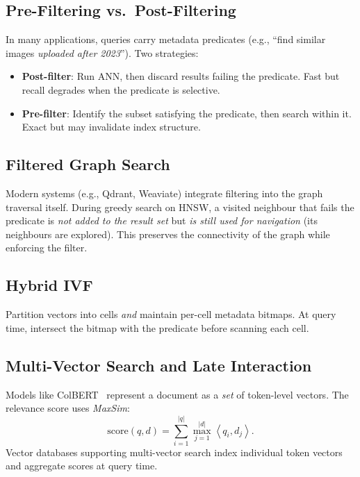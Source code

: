 \documentclass[11pt,a4paper]{article}
\theoremstyle{definition}
\newcommand{\inner}[2]{\left\langle #1, #2 \right\rangle}
\begin{document}
\subsection{Pre-Filtering vs.\ Post-Filtering}

In many applications, queries carry metadata predicates (e.g., ``find
similar images \emph{uploaded after 2023}'').  Two strategies:

\begin{itemize}[nosep]
  \item \textbf{Post-filter}: Run ANN, then discard results failing the
    predicate.  Fast but recall degrades when the predicate is selective.
  \item \textbf{Pre-filter}: Identify the subset satisfying the
    predicate, then search within it.  Exact but may invalidate index
    structure.
\end{itemize}

\subsection{Filtered Graph Search}

Modern systems (e.g., Qdrant, Weaviate) integrate filtering into the
graph traversal itself.  During greedy search on HNSW, a visited
neighbour that fails the predicate is \emph{not added to the result set}
but \emph{is still used for navigation} (its neighbours are explored).
This preserves the connectivity of the graph while enforcing the filter.

\subsection{Hybrid IVF}

Partition vectors into cells \emph{and} maintain per-cell metadata
bitmaps.  At query time, intersect the bitmap with the predicate before
scanning each cell.

\subsection{Multi-Vector Search and Late Interaction}

Models like ColBERT~\cite{khattab2020colbert} represent a document as a \emph{set} of token-level
vectors.  The relevance score uses \emph{MaxSim}:
\[
  \mathrm{score}(q, d) = \sum_{i=1}^{|q|} \max_{j=1}^{|d|}
  \inner{q_i}{d_j}.
\]
Vector databases supporting multi-vector search index individual token
vectors and aggregate scores at query time.
\end{document}
